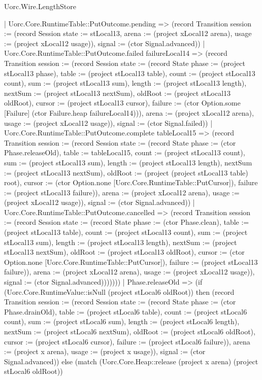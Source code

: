 \begin{lexlean}{Uorc.Wire.LengthStore}
\begin{semanticmodule}
{        | Uorc.Core.RuntimeTable::PutOutcome.pending => (record Transition {session := (record Session {state := stLocal13, arena := (project xLocal12 arena), usage := (project xLocal12 usage)}), signal := (ctor Signal.advanced)})
        | Uorc.Core.RuntimeTable::PutOutcome.failed failureLocal14 => (record Transition {session := (record Session {state := (record State {phase := (project stLocal13 phase), table := (project stLocal13 table), count := (project stLocal13 count), sum := (project stLocal13 sum), length := (project stLocal13 length), nextSum := (project stLocal13 nextSum), oldRoot := (project stLocal13 oldRoot), cursor := (project stLocal13 cursor), failure := (ctor Option.some [Failure] (ctor Failure.heap failureLocal14))}), arena := (project xLocal12 arena), usage := (project xLocal12 usage)}), signal := (ctor Signal.failed)})
        | Uorc.Core.RuntimeTable::PutOutcome.complete tableLocal15 => (record Transition {session := (record Session {state := (record State {phase := (ctor Phase.releaseOld), table := tableLocal15, count := (project stLocal13 count), sum := (project stLocal13 sum), length := (project stLocal13 length), nextSum := (project stLocal13 nextSum), oldRoot := (project (project stLocal13 table) root), cursor := (ctor Option.none [Uorc.Core.RuntimeTable::PutCursor]), failure := (project stLocal13 failure)}), arena := (project xLocal12 arena), usage := (project xLocal12 usage)}), signal := (ctor Signal.advanced)})
        | Uorc.Core.RuntimeTable::PutOutcome.cancelled => (record Transition {session := (record Session {state := (record State {phase := (ctor Phase.clean), table := (project stLocal13 table), count := (project stLocal13 count), sum := (project stLocal13 sum), length := (project stLocal13 length), nextSum := (project stLocal13 nextSum), oldRoot := (project stLocal13 oldRoot), cursor := (ctor Option.none [Uorc.Core.RuntimeTable::PutCursor]), failure := (project stLocal13 failure)}), arena := (project xLocal12 arena), usage := (project xLocal12 usage)}), signal := (ctor Signal.advanced)}))))))
      | Phase.releaseOld => (if (Uorc.Core.RuntimeValue::isNull (project stLocal6 oldRoot)) then (record Transition {session := (record Session {state := (record State {phase := (ctor Phase.drainOld), table := (project stLocal6 table), count := (project stLocal6 count), sum := (project stLocal6 sum), length := (project stLocal6 length), nextSum := (project stLocal6 nextSum), oldRoot := (project stLocal6 oldRoot), cursor := (project stLocal6 cursor), failure := (project stLocal6 failure)}), arena := (project x arena), usage := (project x usage)}), signal := (ctor Signal.advanced)}) else (match (Uorc.Core.Heap::release (project x arena) (project stLocal6 oldRoot))
}
\end{semanticmodule}
\end{lexlean}
